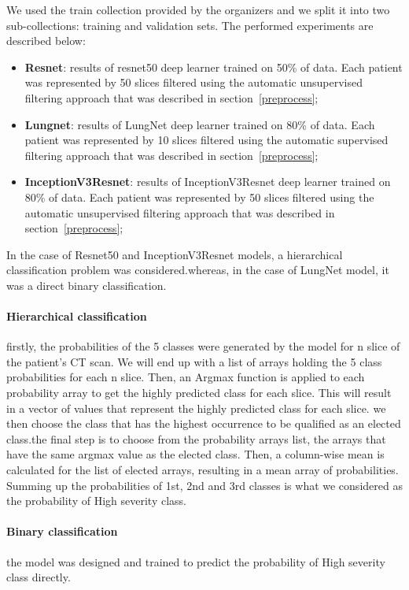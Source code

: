 We used the train collection provided by the organizers and we split it into two sub-collections: training and validation sets. The performed experiments are described below:
\begin{itemize}

\item \textbf{Resnet}: results of resnet50 deep learner trained on 50\% of data. Each patient was represented by 50 slices filtered using the automatic unsupervised filtering approach that was described in section~\ref{preprocess};

\item \textbf{Lungnet}: results of LungNet deep learner trained on 80\% of data. Each patient was represented by 10 slices filtered using the automatic supervised filtering approach that was described in section~\ref{preprocess};

\item \textbf{InceptionV3Resnet}: results of InceptionV3Resnet deep learner trained on 80\% of data. Each patient was represented by 50 slices filtered using the automatic unsupervised filtering approach that was described in section~\ref{preprocess};
\end{itemize}

In the case of Resnet50 and InceptionV3Resnet models, a hierarchical classification problem was considered.whereas, in the case of LungNet model, it was a direct binary classification.
\paragraph{Hierarchical classification}firstly, the probabilities of the 5 classes were generated by the model for n slice of the patient's CT scan. We will end up with a list of arrays holding the 5 class probabilities for each n slice. Then, an Argmax function is applied to each probability array to get the highly predicted class for each slice. This will result in a vector of values that represent the highly predicted class for each slice. we then choose the class that has the highest occurrence to be qualified as an elected class.the final step is to choose from the probability arrays list, the arrays that have the same argmax value as the elected class. Then, a column-wise mean is calculated for the list of elected arrays, resulting in a mean array of probabilities. Summing up the probabilities of 1st, 2nd and 3rd classes is what we considered as the probability of High severity class.
\paragraph{Binary classification}the model was designed and trained to predict the probability of High severity class directly.

